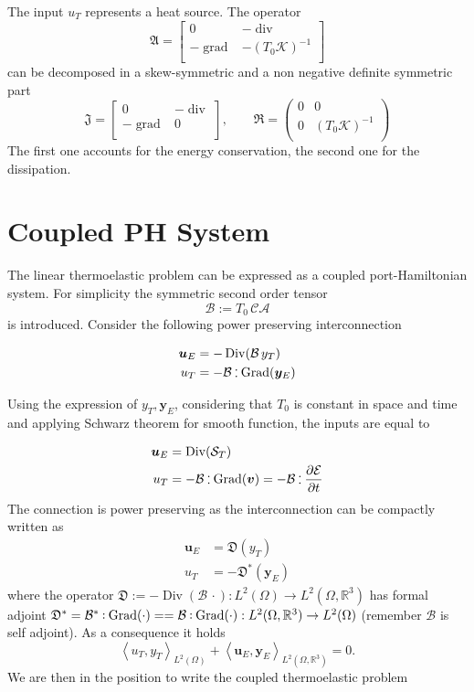 \documentclass[11t]{article}
\DeclareMathOperator*{\grad}{grad}
\DeclareMathOperator*{\Grad}{Grad}
\DeclareMathOperator*{\Div}{Div}
\renewcommand{\div}{\operatorname{div}}
\def\onedot{$\mathsurround0pt\ldotp$}
\def\cddot{%
	\mathbin{\vcenter{\baselineskip.67ex
			\hbox{\onedot}\hbox{\onedot}}%
}}
\begin{document}
The input $u_T$ represents a heat source. The operator 
\[
\mathfrak{A} = \begin{bmatrix}
0 & -\div \\
-\grad & - (T_0 \mathcal{K})^{-1} \\
\end{bmatrix}
\]
can be decomposed in a skew-symmetric and a non negative definite symmetric part
\[
\mathfrak{J} = \begin{bmatrix}
0 & -\div \\
-\grad & 0 \\
\end{bmatrix}, \qquad
\mathfrak{R} = \begin{pmatrix}
0 & 0 \\
0 & (T_0 \mathcal{K})^{-1} \\
\end{pmatrix}
\]
The first one accounts for the energy conservation, the second one for the dissipation.

\section{Coupled PH System}
The linear thermoelastic problem can be expressed as a coupled port-Hamiltonian system. For simplicity the symmetric second order tensor 
\[\mathcal{B}:=T_0 \, \mathcal{C} \mathcal{A}\]
 is introduced.
 Consider the following power preserving interconnection

\begin{align}
\bm{u}_E &= - \Div(\mathcal{B} \, y_T) \\
u_T &= - \mathcal{B} \cddot\Grad(\bm{y}_E) 
\end{align}

Using the expression of $y_T, \bm{y}_E$, considering that $T_0$ is constant in space and time and applying Schwarz theorem for smooth function, the inputs are equal to

\begin{align*}
\bm{u}_E &=  \Div(\mathcal{S}_T) \\
u_T &= - \mathcal{B} \cddot  \Grad(\bm{v}) = - \mathcal{B} \cddot  \diffp{\mathcal{E}}{t} 
\end{align*}
The connection is power preserving as the interconnection can be compactly written as 
\begin{align}
\bm{u}_E &= \mathfrak{D}(y_T) \\
u_T &= - \mathfrak{D}^*(\bm{y}_E) 
\end{align}
where the operator $\mathfrak{D} := - \Div(\mathcal{B} \, \cdot) : L^2(\Omega) \rightarrow L^2(\Omega, \mathbb{R}^3)$ has formal adjoint $ \mathfrak{D}^* =  \mathcal{B}^* \cddot  \Grad(\cdot) = =  \mathcal{B} \cddot  \Grad(\cdot): L^2(\Omega, \mathbb{R}^3) \rightarrow L^2(\Omega)$ (remember $\mathcal{B}$ is self adjoint). As a consequence it holds
\[
\left\langle u_T, y_T \right\rangle_{L^2(\Omega)} + \left\langle \bm{u}_E, \bm{y}_E \right\rangle_{L^2(\Omega, \mathbb{R}^3)} = 0.
\]
 We are then in the position to write the coupled thermoelastic problem 
\end{document}
